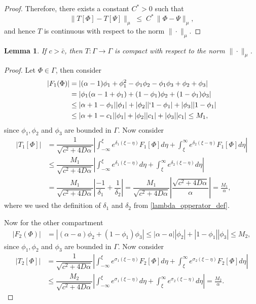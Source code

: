 \documentclass[11pt]{article}
\newtheorem{lemma}[thm]{Lemma}
\theoremstyle{definition}
\begin{document}
{\begin{proof}
Therefore, there exists a constant $C^{*}>0$ such that
\[
\|T[\Phi]-T[\Psi]\|_{\mu}
   \;\le\; C^{*}\,\|\Phi-\Psi\|_{\mu},
\]
and hence $T$ is continuous with respect to the norm $\|\cdot\|_{\mu}$.
    \end{proof}
\begin{lemma}
If $c > \bar{c}$, then $T : \Gamma \to \Gamma$ is compact with respect to the norm $\|\cdot\|_{\mu}$.
\end{lemma}
\begin{proof}
    Let $\Phi \in \Gamma$, then consider 
    \begin{align}
        |F_1(\Phi)|&= |(\alpha-1)\phi_1+\phi_1^2-\phi_1\phi_2-\phi_1\phi_3+\phi_2+\phi_3| \\& =|\phi_1(\alpha-1+\phi_1)+ (1-\phi_1)\phi_2+(1-\phi_1)\phi_3|\\& \le |\alpha+1-\phi_1||\phi_1|+|\phi_2||`1-\phi_1|+|\phi_3||1-\phi_1| \\& \le  |\alpha+1-c_1||\phi_1|+|\phi_2||c_1|+|\phi_3||c_1|  \le M_1,
    \end{align}
since $\phi_1, \phi_2$ and $\phi_3$ are bounded in $\Gamma$. Now consider \begin{align}
    |T_1[\Phi]|&=\dfrac{1}{\sqrt{c^2+ 4 D \alpha}}\left|\int_{- \infty}^{\xi}e^{\delta_1(\xi-\eta)}F_1[\Phi] d \eta 
 + \int_{\xi}^{\infty }e^{\delta_2(\xi-\eta)}F_1[\Phi] d \eta  \right|\\&  \le \dfrac{M_1}{\sqrt{c^2+ 4 D \alpha}}\left|\int_{- \infty}^{\xi}e^{\delta_1(\xi-\eta)} d \eta 
 + \int_{\xi}^{\infty }e^{\delta_2(\xi-\eta)} d \eta  \right|\\& =\dfrac{M_1}{\sqrt{c^2+ 4D \alpha}}\left|\dfrac{-1}{\delta_1}+\dfrac{1}{\delta_2}\right|= \dfrac{M_1}{\sqrt{c^2+ 4D \alpha}}\left|\dfrac{\sqrt{c^2+ 4D \alpha}}{\alpha}\right|= \frac{M_1}{\alpha},
\end{align} where we used the definition of $\delta_1$ and $\delta_2$ from \eqref{lambda_opperator_def}.

Now for the other compartment \begin{align}|F_2(\Phi)|&= |(\alpha-a)\phi_2+(1-\phi_1)\phi_3| \le |\alpha-a||\phi_2|+|1-\phi_1||\phi_3| \le  M_2,
    \end{align}
since $\phi_1, \phi_2$ and $\phi_3$ are bounded in $\Gamma$. Now consider \begin{align}
    |T_2[\Phi]|&=\dfrac{1}{\sqrt{c^2+ 4 D \alpha}}\left|\int_{- \infty}^{\xi}e^{\sigma_1(\xi-\eta)}F_2[\Phi] d \eta 
 + \int_{\xi}^{\infty }e^{\sigma_2(\xi-\eta)}F_2[\Phi] d \eta  \right|\\&  \le \dfrac{M_2}{\sqrt{c^2+ 4 D \alpha}}\left|\int_{- \infty}^{\xi}e^{\sigma_1(\xi-\eta)} d \eta 
 + \int_{\xi}^{\infty }e^{\sigma_2(\xi-\eta)} d \eta  \right|=  \frac{M_2}{\alpha}.
\end{align} 


\end{proof}}
\end{document}
